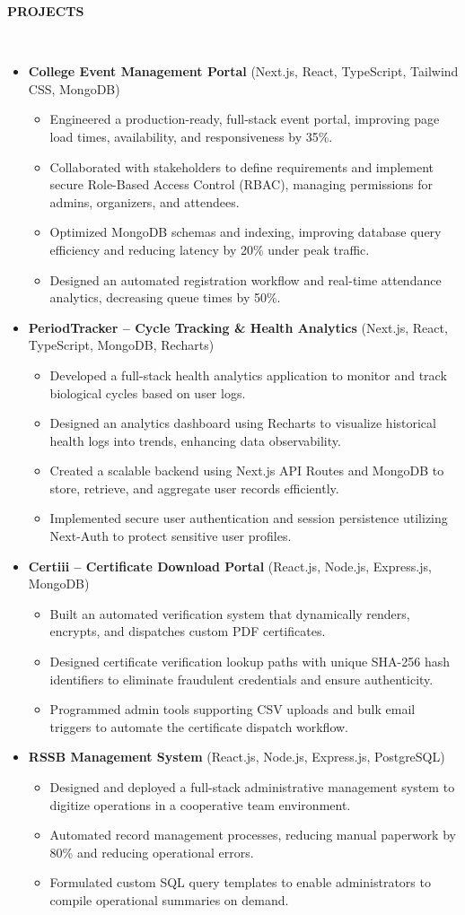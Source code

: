 \documentclass[a4paper,10pt]{article}
\newcommand{\isep}{-2 pt}
\newcommand{\lsep}{-0.5cm}
\newcommand{\resitem}[1]{\item #1 \vspace{-2pt}}
\newcommand{\resheading}[1]{{\small \colorbox{mygrey}{\begin{minipage}{0.975\textwidth}{\textbf{#1 \vphantom{p\^{E}}}}\end{minipage}}}}
\begin{document}
\resheading{\textbf{PROJECTS} }\\[\lsep]
\begin{itemize}
\setlength\itemsep{0.5em}
\item \textbf{College Event Management Portal} (Next.js, React, TypeScript, Tailwind CSS, MongoDB)
	\begin{itemize}\setlength{\itemsep}{\isep}
	\resitem{Engineered a production-ready, full-stack event portal, improving page load times, availability, and responsiveness by 35\%.}
	\resitem{Collaborated with stakeholders to define requirements and implement secure Role-Based Access Control (RBAC), managing permissions for admins, organizers, and attendees.}
	\resitem{Optimized MongoDB schemas and indexing, improving database query efficiency and reducing latency by 20\% under peak traffic.}
	\resitem{Designed an automated registration workflow and real-time attendance analytics, decreasing queue times by 50\%.}
	\end{itemize}

\item \textbf{PeriodTracker -- Cycle Tracking \& Health Analytics} (Next.js, React, TypeScript, MongoDB, Recharts)
	\begin{itemize}\setlength{\itemsep}{\isep}
	\resitem{Developed a full-stack health analytics application to monitor and track biological cycles based on user logs.}
	\resitem{Designed an analytics dashboard using Recharts to visualize historical health logs into trends, enhancing data observability.}
	\resitem{Created a scalable backend using Next.js API Routes and MongoDB to store, retrieve, and aggregate user records efficiently.}
	\resitem{Implemented secure user authentication and session persistence utilizing Next-Auth to protect sensitive user profiles.}
	\end{itemize}

\item \textbf{Certiii -- Certificate Download Portal} (React.js, Node.js, Express.js, MongoDB)
	\begin{itemize}\setlength{\itemsep}{\isep}
	\resitem{Built an automated verification system that dynamically renders, encrypts, and dispatches custom PDF certificates.}
	\resitem{Designed certificate verification lookup paths with unique SHA-256 hash identifiers to eliminate fraudulent credentials and ensure authenticity.}
	\resitem{Programmed admin tools supporting CSV uploads and bulk email triggers to automate the certificate dispatch workflow.}
	\end{itemize}

\item \textbf{RSSB Management System} (React.js, Node.js, Express.js, PostgreSQL)
	\begin{itemize}\setlength{\itemsep}{\isep}
	\resitem{Designed and deployed a full-stack administrative management system to digitize operations in a cooperative team environment.}
	\resitem{Automated record management processes, reducing manual paperwork by 80\% and reducing operational errors.}
	\resitem{Formulated custom SQL query templates to enable administrators to compile operational summaries on demand.}
	\end{itemize}
\end{itemize}
\end{document}
